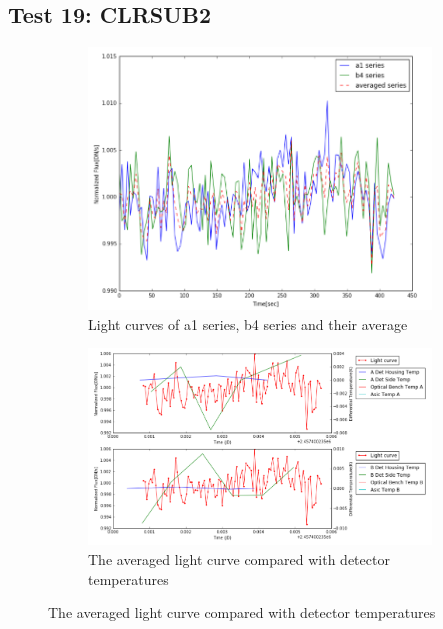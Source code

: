 \documentclass[conference]{IEEEtran}
\begin{document}
\subsection{Test 19: CLRSUB2} 
\begin{figure}[H]
    \centering
    \begin{subfigure}{1}
        \includegraphics[scale=0.4]{ts_test19}
        \caption{Light curves of a1 series, b4 series and their average}
    \end{subfigure}

    \begin{subfigure}{2}
        \includegraphics[scale=0.4]{temp_test19}
        \caption{The averaged light curve compared with detector temperatures}
    \end{subfigure}
   

\end{figure}
\end{document}
